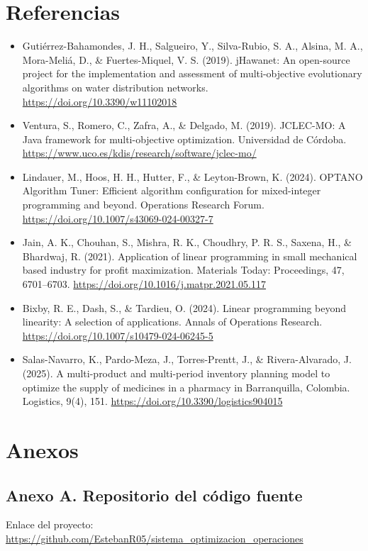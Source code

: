\documentclass[12pt,letterpaper]{article}
\begin{document}
\section{Referencias}

\begin{itemize}[leftmargin=*]
	\item Gutiérrez-Bahamondes, J. H., Salgueiro, Y., Silva-Rubio, S. A., Alsina, M. A., Mora-Meliá, D., \& Fuertes-Miquel, V. S. (2019). jHawanet: An open-source project for the implementation and assessment of multi-objective evolutionary algorithms on water distribution networks. \url{https://doi.org/10.3390/w11102018}
	\item Ventura, S., Romero, C., Zafra, A., \& Delgado, M. (2019). JCLEC-MO: A Java framework for multi-objective optimization. Universidad de Córdoba. \url{https://www.uco.es/kdis/research/software/jclec-mo/}
	\item Lindauer, M., Hoos, H. H., Hutter, F., \& Leyton-Brown, K. (2024). OPTANO Algorithm Tuner: Efficient algorithm configuration for mixed-integer programming and beyond. Operations Research Forum. \url{https://doi.org/10.1007/s43069-024-00327-7}
	\item Jain, A. K., Chouhan, S., Mishra, R. K., Choudhry, P. R. S., Saxena, H., \& Bhardwaj, R. (2021). Application of linear programming in small mechanical based industry for profit maximization. Materials Today: Proceedings, 47, 6701--6703. \url{https://doi.org/10.1016/j.matpr.2021.05.117}
	\item Bixby, R. E., Dash, S., \& Tardieu, O. (2024). Linear programming beyond linearity: A selection of applications. Annals of Operations Research. \url{https://doi.org/10.1007/s10479-024-06245-5}
	\item Salas-Navarro, K., Pardo-Meza, J., Torres-Prentt, J., \& Rivera-Alvarado, J. (2025). A multi-product and multi-period inventory planning model to optimize the supply of medicines in a pharmacy in Barranquilla, Colombia. Logistics, 9(4), 151. \url{https://doi.org/10.3390/logistics904015}
\end{itemize}

\clearpage
\section{Anexos}

\subsection*{Anexo A. Repositorio del código fuente}
\noindent Enlace del proyecto: \url{https://github.com/EstebanR05/sistema_optimizacion_operaciones}
\end{document}
